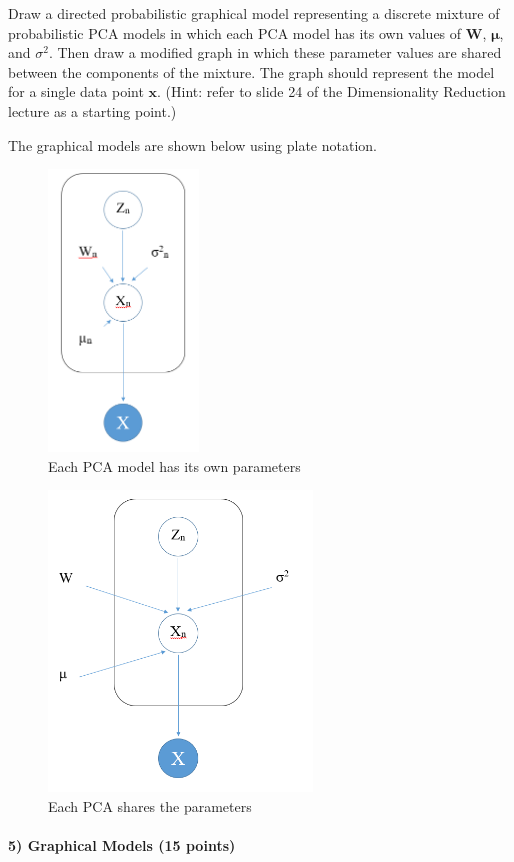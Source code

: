 \documentclass{article}
\begin{document}
Draw a directed probabilistic graphical model representing a discrete mixture of probabilistic PCA models in which each PCA model has its own values of $\mathbf{W}$, $\boldsymbol{\mu}$, and $\sigma^2$. Then draw a modified graph in which these parameter values are shared between the components of the mixture. The graph should represent the model for a single data point $\mathbf{x}$. (Hint: refer to slide 24 of the Dimensionality Reduction lecture as a starting point.)
\begin{soln}
	The graphical models are shown below using plate notation.
	\begin{figure}[ht]
		\centering
		\includegraphics[width=4cm]{4a.PNG}
		\caption{Each PCA model has its own parameters}
	\end{figure}
	\begin{figure}[H]
		\centering
		\includegraphics[width=7cm]{4b.PNG}
		\caption{Each PCA shares the parameters}
	\end{figure}	
\end{soln}


\newpage
\paragraph{5) Graphical Models (15 points)}
\end{document}
